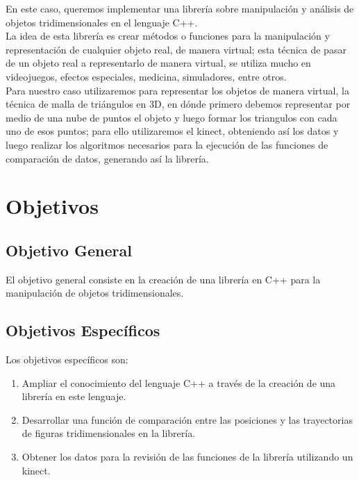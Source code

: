 \documentclass[letterpaper]{article}
\begin{document}
En este caso, queremos implementar una librería sobre manipulación y análisis de objetos tridimensionales
en el lenguaje C++.\\

La idea  de esta librería es crear métodos o funciones para la manipulación y representación 
de cualquier objeto real, de manera virtual; esta técnica de pasar de un objeto real a representarlo de manera virtual, se utiliza mucho 
en videojuegos, efectos especiales, medicina, simuladores, entre otros.\\

Para nuestro caso utilizaremos para representar los objetos de manera virtual, la técnica de malla de triángulos en 3D, en dónde primero debemos 
representar por medio de una nube de puntos el objeto y luego formar los triangulos con cada uno de esos puntos; para ello utilizaremos el kinect, 
obteniendo así los datos y luego realizar los algoritmos necesarios para la ejecución de las funciones de comparación de datos, generando así la librería. 

\section{Objetivos}

\subsection{Objetivo General}


El objetivo general consiste en la creación de una librería en C++ para la manipulación de objetos tridimensionales.\\


\subsection{Objetivos Específicos}

Los objetivos específicos son:\\

\begin{enumerate}
\item Ampliar el conocimiento del lenguaje C++ a través de la creación de una librería en este lenguaje. 
\item Desarrollar una función de comparación entre las posiciones y las trayectorias de figuras tridimensionales en la librería.
\item Obtener los datos para la revisión de las funciones de la librería utilizando un kinect.
\end{enumerate}
\end{document}
